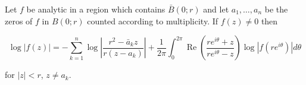Let $f$ be analytic in a region which contains $\bar{B}(0; r)$ and let $a_1, \ldots, a_n$ be the zeros of $f$ in $B(0; r)$ counted according to multiplicity. If $f(z) \neq 0$ then

$$\log |f(z)| = -\sum_{k=1}^{n} \log \left| \frac{r^2 - \bar{a}_k z}{r(z - a_k)} \right| + \frac{1}{2\pi} \int_{0}^{2\pi} \operatorname{Re} \left( \frac{re^{i\theta} + z}{re^{i\theta} - z} \right) \log |f(re^{i\theta})| d\theta$$

for $|z| < r$, $z \neq a_k$.